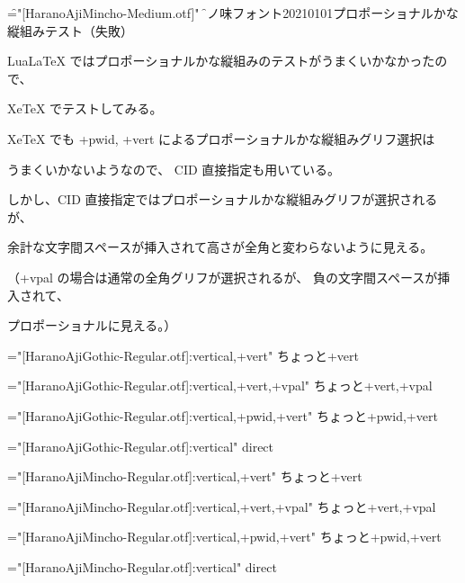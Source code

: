 

\font\f="[HaranoAjiMincho-Medium.otf]"
\f

原ノ味フォント20210101プロポーショナルかな縦組みテスト（失敗）

LuaLaTeX ではプロポーショナルかな縦組みのテストがうまくいかなかったので、

XeTeX でテストしてみる。

XeTeX でも +pwid, +vert によるプロポーショナルかな縦組みグリフ選択は

うまくいかないようなので、 CID 直接指定も用いている。

しかし、CID 直接指定ではプロポーショナルかな縦組みグリフが選択されるが、

余計な文字間スペースが挿入されて高さが全角と変わらないように見える。

（+vpal の場合は通常の全角グリフが選択されるが、
負の文字間スペースが挿入されて、

プロポーショナルに見える。）

\font\hgr="[HaranoAjiGothic-Regular.otf]:vertical,+vert"
\hgr
ちょっと+vert

\font\hgrvpal="[HaranoAjiGothic-Regular.otf]:vertical,+vert,+vpal"
\hgrvpal
ちょっと+vert,+vpal

\font\hgrpwidvert="[HaranoAjiGothic-Regular.otf]:vertical,+pwid,+vert"
\hgrpwidvert
ちょっと+pwid,+vert

\font\hgrdirect="[HaranoAjiGothic-Regular.otf]:vertical"
\hgrdirect
{}%
direct

\font\hmr="[HaranoAjiMincho-Regular.otf]:vertical,+vert"
\hmr
ちょっと+vert

\font\hmrvpal="[HaranoAjiMincho-Regular.otf]:vertical,+vert,+vpal"
\hmrvpal
ちょっと+vert,+vpal

\font\hmrpwidvert="[HaranoAjiMincho-Regular.otf]:vertical,+pwid,+vert"
\hmrpwidvert
ちょっと+pwid,+vert

\font\hmrdirect="[HaranoAjiMincho-Regular.otf]:vertical"
\hmrdirect
{}%
direct

\bye
